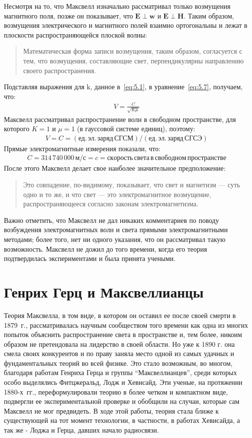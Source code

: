 \documentclass[12pt, oneside, a4paper]{article}
\begin{document}
Несмотря на то, что Максвелл изначально рассматривал только возмущения магнитного поля, позже он показывает, что $\mathbf{E}\perp\mathbf{w}$ и $\mathbf{E}\perp\mathbf{H}$. Таким образом, возмущения электрического и магнитного полей  взаимно ортогональны и  лежат в плоскости распространяющейся плоской волны:
\begin{quote}\small
Математическая форма записи возмущения, таким образом, согласуется с тем, что возмущения, составляющие свет, перпендикулярны направлению своего распространения.
\end{quote}
Подставляя выражения для $\mathrm{k}$, данное в~\eqref{eq:5.1}, в уравнение~\eqref{eq:5.7}, получаем, что:
\begin{align*}
V=\frac{C}{\sqrt{K\mu}}
\end{align*}
Максвелл рассматривал распространение волн в свободном пространстве, для которого $K=1$ и $\mu=1$ (в гауссовой системе единиц), поэтому:
\begin{align*}
V=C=(ед.\,эл.\,заряд\,СГСМ)/(ед.\,эл.\,заряд\,СГСЭ)
\end{align*}
Прямые электромагнитные измерения показали, что:
\begin{align*}
C=314\,740\,000\, м/с=c=скорость\,света\,в\,свободном\,пространстве
\end{align*}
После этого Максвелл делает свое наиболее значительное предположение:
\begin{quote}
Это совпадение, по-видимому, показывает, что свет и магнетизм --- суть одно и то же, и что свет --- это электромагнитное возмущение, распространяющееся согласно законам электромагнетизма.
\end{quote} 

Важно отметить, что Максвелл не дал никаких комментариев по поводу возбуждения электромагнитных волн и света прямыми электромагнитными методами; более того, нет ни одного указания, что он рассматривал такую возможность. Максвелл не дожил до того времени, когда его теория подтвердилась экспериментами и была принята учеными. 
\section{Генрих Герц и Максвеллианцы}
Теория Максвелла, в том виде, в котором он оставил ее после своей смерти в 1879~г., рассматривалась научным сообществом того времени как одна из многих попыток объяснить распространение света в пространстве и, тем более, никоим образом не претендовала на лидерство в своей области. Но уже к 1890 г. она смела своих конкурентов и по праву заняла место одной из самых удачных и фундаментальных теорий во всей физике. Это стало возможным, во многом, благодаря работам Генриха Герца и группы ``Максвеллианцев'', среди которых особо выделялись Фитцжеральд, Лодж и Хевисайд. Эти ученые, на протяжении 1880-х~гг., переформулировали теорию в более четком и компактном виде, подвергли ее экспериментальной проверке  и обобщили на случаи, которые сам Максвелл не мог предвидеть. В ходе этой работы, теория стала ближе к существующей на тот момент технологии, в частности, в работах Хевисайда, а так же - Лоджа и Герца, давших начало радиосвязи.
\end{document}
